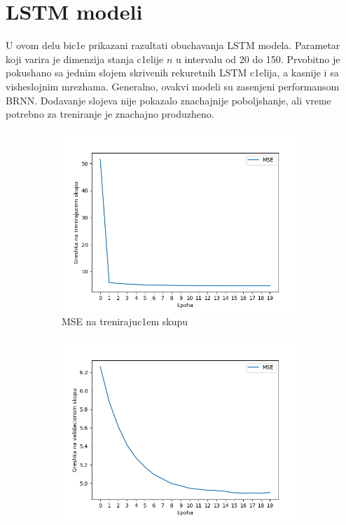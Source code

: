\documentclass[a4paper, openany, oneside, 11pt]{book}
\begin{document}
\section[$LSTM$ modeli]{$\mathbf{LSTM}$ modeli}
U ovom delu bic1e prikazani razultati obuchavanja \acrshort{LSTM} modela. Parametar koji varira je dimenzija stanja c1elije $n$ u intervalu od 20 do 150. Prvobitno je pokushano sa jednim slojem skrivenih rekuretnih \acrshort{LSTM} c1elija, a kasnije i sa visheslojnim mrezhama. Generalno, ovakvi modeli su zasenjeni performansom \acrshort{BRNN}. Dodavanje slojeva nije pokazalo znachajnije poboljshanje, ali vreme potrebno za treniranje je znachajno produzheno.
\newpage
\begin{figure}[!h]
        \centering
        \begin{subfigure}{0.475\textwidth}
            \centering
            \includegraphics[scale=0.45]{res/SingleLayerLSTM_30units_train.png}
            \caption{\acrshort{MSE} na trenirajuc1em skupu}
            \label{fig:4_1a}
            \vspace{0pt}
        \end{subfigure}%
        \begin{subfigure}{0.475\textwidth}
            \centering
            \includegraphics[scale=0.45]{res/SingleLayerLSTM_30units_validation.png}

\end{subfigure}
\end{figure}
\end{document}
